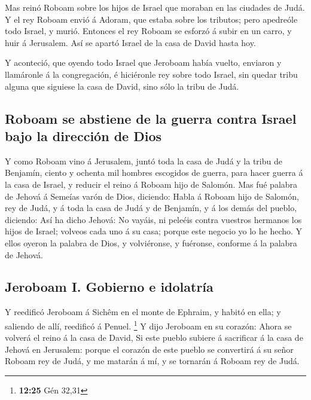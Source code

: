  Mas reinó Roboam sobre los hijos de Israel que moraban en
las ciudades de Judá.  Y el rey Roboam envió á Adoram, que
estaba sobre los tributos; pero apedreóle todo Israel, y murió. Entonces
el rey Roboam se esforzó á subir en un carro, y huir á Jerusalem.
 Así se apartó Israel de la casa de David hasta hoy.

 Y aconteció, que oyendo todo Israel que Jeroboam había
vuelto, enviaron y llamáronle á la congregación, é hiciéronle rey sobre
todo Israel, sin quedar tribu alguna que siguiese la casa de David, sino
sólo la tribu de Judá.

\hypertarget{roboam-se-abstiene-de-la-guerra-contra-israel-bajo-la-direcciuxf3n-de-dios}{%
\subsection{Roboam se abstiene de la guerra contra Israel bajo la
dirección de
Dios}\label{roboam-se-abstiene-de-la-guerra-contra-israel-bajo-la-direcciuxf3n-de-dios}}

 Y como Roboam vino á Jerusalem, juntó toda la casa de Judá
y la tribu de Benjamín, ciento y ochenta mil hombres escogidos de
guerra, para hacer guerra á la casa de Israel, y reducir el reino á
Roboam hijo de Salomón.  Mas fué palabra de Jehová á
Semeías varón de Dios, diciendo:  Habla á Roboam hijo de
Salomón, rey de Judá, y á toda la casa de Judá y de Benjamín, y á los
demás del pueblo, diciendo:  Así ha dicho Jehová: No
vayáis, ni peleéis contra vuestros hermanos los hijos de Israel; volveos
cada uno á su casa; porque este negocio yo lo he hecho. Y ellos oyeron
la palabra de Dios, y volviéronse, y fuéronse, conforme á la palabra de
Jehová.

\hypertarget{jeroboam-i.-gobierno-e-idolatruxeda}{%
\subsection{Jeroboam I. Gobierno e
idolatría}\label{jeroboam-i.-gobierno-e-idolatruxeda}}

 Y reedificó Jeroboam á Sichêm en el monte de Ephraim, y
habitó en ella; y saliendo de allí, reedificó á Penuel. \footnote{\textbf{12:25}
  Gén 32,31}  Y dijo Jeroboam en su corazón: Ahora se
volverá el reino á la casa de David,  Si este pueblo
subiere á sacrificar á la casa de Jehová en Jerusalem: porque el corazón
de este pueblo se convertirá á su señor Roboam rey de Judá, y me matarán
á mí, y se tornarán á Roboam rey de Judá.

